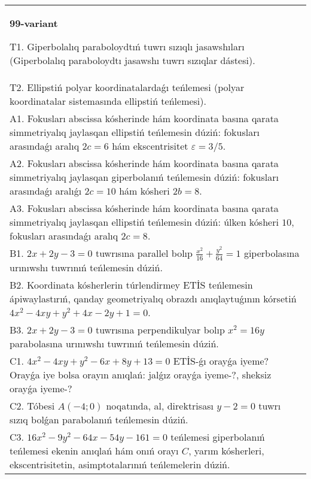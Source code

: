 \documentclass{article}
\begin{document}
\begin{tabular}{m{17cm}}
\textbf{99-variant}
\newline

T1. Giperbolalıq paraboloydtıń tuwrı sızıqlı jasawshıları (Giperbolalıq paraboloydtı jasawshı tuwrı sızıqlar dástesi).\\

T2. Ellipstiń polyar koordinatalardaǵı teńlemesi (polyar koordinatalar sistemasında ellipstiń teńlemesi).\\

A1. Fokusları abscissa kósherinde hám koordinata basına qarata simmetriyalıq jaylasqan ellipstiń teńlemesin dúziń: fokusları arasındaǵı aralıq $2 c=6$ hám ekscentrisitet $\varepsilon=3/5$.\\

A2. Fokusları abscissa kósherinde hám koordinata basına qarata simmetriyalıq jaylasqan giperbolanıń teńlemesin dúziń: fokusları arasındaǵı aralıǵı $2 c=10$ hám kósheri $2 b=8$.\\

A3. Fokusları abscissa kósherinde hám koordinata basına qarata simmetriyalıq jaylasqan ellipstiń teńlemesin dúziń: úlken kósheri $10$, fokusları arasındaǵı aralıq $2 c=8$.\\

B1. $2x + 2y - 3 = 0$ tuwrısına parallel bolıp $\frac{x^{2}}{16} + \frac{y^{2}}{64} = 1$ giperbolasına urınıwshı tuwrınıń teńlemesin dúziń.  \\

B2. Koordinata kósherlerin túrlendirmey ETİS teńlemesin ápiwaylastırıń, qanday geometriyalıq obrazdı anıqlaytuǵının kórsetiń $4x^{2} - 4xy + y^{2} + 4x - 2y + 1 = 0$.  \\

B3. $2x + 2y - 3 = 0$ tuwrısına perpendikulyar bolıp $x^{2} = 16y$ parabolasına urınıwshı tuwrınıń teńlemesin dúziń.  \\

C1. $4x^{2} - 4xy + y^{2} - 6x + 8y + 13 = 0$ ETİS-ǵı orayǵa iyeme? Orayǵa iye bolsa orayın anıqlań: jalǵız orayǵa iyeme-?, sheksiz orayǵa iyeme-?  \\

C2. Tóbesi $A(-4;0)$ noqatında, al, direktrisası $y - 2 = 0$ tuwrı sızıq bolǵan parabolanıń teńlemesin dúziń.\\

C3. $16x^{2} - 9y^{2} - 64x - 54y - 161 = 0$ teńlemesi giperbolanıń teńlemesi ekenin anıqlań hám onıń orayı $C$, yarım kósherleri, ekscentrisitetin, asimptotalarınıń teńlemelerin dúziń.  \\

\end{tabular}
\vspace{1cm}
\end{document}
